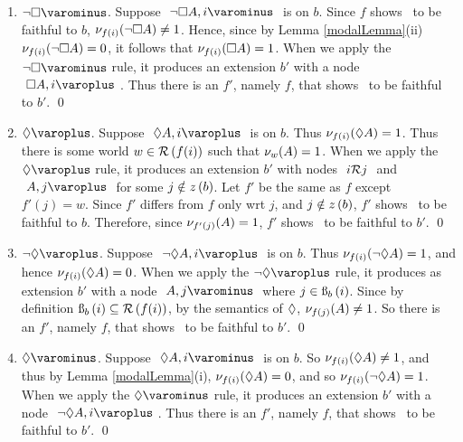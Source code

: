 \begin{proof*}
\begin{enumerate}
		\item $\uRule{ \neg\Box }$. Suppose $ \like{ \uNode{ \neg \Box A }{ i }} $ is on $ b $.
							Since $ f $ shows \Model\ to be faithful to $ b $, $ \mathcal{\nu}_{ f(i) }({ \neg \Box A }) \neq 1 $.
							Hence, since by Lemma \ref{modalLemma}(ii) $ \mathcal{\nu}_{ f(i) }({ \neg \Box A }) = 0 $, it follows that $ \mathcal{\nu}_{ f(i) }({ \Box A }) = 1 $.
							When we apply the $ \uRule{ \neg \Box } $ rule, it produces an extension $ b' $ with a node $ \like{ \dNode{ \Box A }{ i }} $.
							Thus there is an $ f' $, namely $ f $, that shows \Model\ to be faithful to $ b' $.  
							\qed

		\item $\dRule{ \Diam }$. Suppose $ \like{ \dNode{ \Diam A }{ i }} $ is on $ b $.
							Thus $ \mathcal{\nu}_{ f(i) }({ \Diamond A }) = 1 $.
							Thus there is some world $ w \in \mathcal{R}\left({ f(i) }\right)$ such that $ \mathcal{\nu}_{ w }({ A }) = 1 $.
							When we apply the $ \dRule{ \Diam } $ rule, 
								it produces an extension $ b' $ with nodes $ \ {  { i } \mathcal{R} { j } }\  $ and $ \like{ \dNode{ A }{ j }} $ for some $ j \notin z\left({b}\right) $.
							Let $ f' $ be the same as $ f $ except $ f'( j ) = w $. 
							Since $ f' $ differs from $ f $ only wrt $ j $, and $ j \notin z\left({b}\right) $, $ f' $ shows \Model\ to be faithful to $ b $.
							Therefore, since $ \mathcal{\nu}_{ f'( j )}({ A }) = 1 $, $ f' $ shows \Model\ to be faithful to $ b' $.  
							\qed

		\item $\dRule{ \neg\Diam }$. Suppose $ \like{ \dNode{ \neg \Diam A }{ i }} $ is on $ b $.
							Thus $ \mathcal{\nu}_{ f(i) }({ \neg \Diamond A }) = 1 $, and hence $ \mathcal{\nu}_{ f(i) }({ \Diamond A }) = 0 $.
							When we apply the $ \dRule{ \neg \Diam } $ rule, 
								it produces as extension $ b' $ with a node $ \like{ \uNode{ A }{ j }} $ where $ j \in \text{\ss}_{b}\left({i}\right)$.
							Since by definition $ \text{\ss}_{b}\left({i}\right) \subseteq \mathcal{R}\left({ f(i) }\right) $, by the semantics of $ \Diamond $, 
							$ \mathcal{\nu}_{ f(j) }({ A }) \neq 1 $. So there is an $ f' $, namely $ f $, that shows \Model\ to be faithful to $ b' $.  
								\qed

		\item $\uRule{ \Diam }$. Suppose $ \like{ \uNode{ \Diam A }{ i }} $ is on $ b $.
							So $ \mathcal{\nu}_{ f(i) }({ \Diamond A }) \neq 1 $, 
							and thus by Lemma \ref{modalLemma}(i), $ \mathcal{\nu}_{ f(i) }({ \Diamond A }) = 0 $, 
							and so $ \mathcal{\nu}_{ f(i) }({ \neg \Diamond A }) = 1 $.
							When we apply the $ \uRule{ \Diam } $ rule, it produces an extension $ b' $ with a node $ \like{ \dNode{ \neg \Diam A }{ i }} $.
							Thus there is an $ f' $, namely $ f $, that shows \Model\ to be faithful to $ b' $.  
							\qed


\end{enumerate}
\end{proof*}
